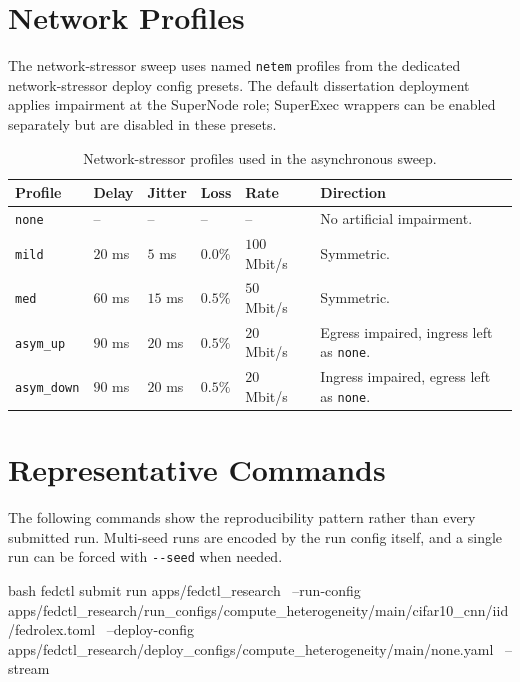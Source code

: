 \section{Network Profiles}

The network-stressor sweep uses named \texttt{netem} profiles from the dedicated network-stressor deploy config presets. The default dissertation deployment applies impairment at the SuperNode role; SuperExec wrappers can be enabled separately but are disabled in these presets.

\begin{table}[!htbp]
\centering
\caption{Network-stressor profiles used in the asynchronous sweep.}
\label{tab:appendix_network_profiles}
\footnotesize
\begin{tabularx}{\textwidth}{>{\raggedright\arraybackslash}p{}>{\centering\arraybackslash}p{}>{\centering\arraybackslash}p{}>{\centering\arraybackslash}p{}>{\centering\arraybackslash}p{}X}
\toprule
Profile & Delay & Jitter & Loss & Rate & Direction \\
\midrule
\texttt{none} & -- & -- & -- & -- & No artificial impairment. \\
\texttt{mild} & \(20\) ms & \(5\) ms & \(0.0\%\) & \(100\) Mbit/s & Symmetric. \\
\texttt{med} & \(60\) ms & \(15\) ms & \(0.5\%\) & \(50\) Mbit/s & Symmetric. \\
\texttt{asym\_up} & \(90\) ms & \(20\) ms & \(0.5\%\) & \(20\) Mbit/s & Egress impaired, ingress left as \texttt{none}. \\
\texttt{asym\_down} & \(90\) ms & \(20\) ms & \(0.5\%\) & \(20\) Mbit/s & Ingress impaired, egress left as \texttt{none}. \\
\bottomrule
\end{tabularx}
\end{table}

\FloatBarrier
\section{Representative Commands}

The following commands show the reproducibility pattern rather than every submitted run. Multi-seed runs are encoded by the run config itself, and a single run can be forced with \verb|--seed| when needed.

\begin{codeblock}[minted options app={breaklines,breakanywhere,fontsize=\footnotesize}]{bash}
fedctl submit run apps/fedctl_research \
  --run-config apps/fedctl_research/run_configs/compute_heterogeneity/main/cifar10_cnn/iid/fedrolex.toml \
  --deploy-config apps/fedctl_research/deploy_configs/compute_heterogeneity/main/none.yaml \
  --stream
\end{codeblock}

